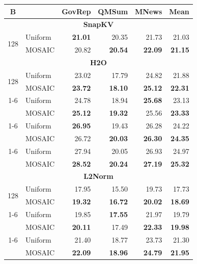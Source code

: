 \begin{table}[tp]
  \centering
  \scriptsize
  \setlength{\tabcolsep}{5pt}
  \renewcommand{\arraystretch}{0.92}
  \begin{tabular}{@{} c l rrrr @{}}
    \toprule
    \textbf{B} & & \textbf{GovRep} & \textbf{QMSum} & \textbf{MNews} & \textbf{Mean} \\
    \midrule
    \multicolumn{6}{c}{\textbf{SnapKV}} \\
    \midrule
    \multirow{2}{*}{128} & Uniform & \textbf{21.01} & 20.35 & 21.73 & 21.03 \\
     & MOSAIC & 20.82 & \textbf{20.54} & \textbf{22.09} & \textbf{21.15} \\
    \midrule
    \multicolumn{6}{c}{\textbf{H2O}} \\
    \midrule
    \multirow{2}{*}{128} & Uniform & 23.02 & 17.79 & 24.82 & 21.88 \\
     & MOSAIC & \textbf{23.72} & \textbf{18.10} & \textbf{25.12} & \textbf{22.31} \\
    \cmidrule(l){1-6}
    \multirow{2}{*}{256} & Uniform & 24.78 & 18.94 & \textbf{25.68} & 23.13 \\
     & MOSAIC & \textbf{25.12} & \textbf{19.32} & 25.56 & \textbf{23.33} \\
    \cmidrule(l){1-6}
    \multirow{2}{*}{512} & Uniform & \textbf{26.95} & 19.43 & 26.28 & 24.22 \\
     & MOSAIC & 26.72 & \textbf{20.03} & \textbf{26.30} & \textbf{24.35} \\
    \cmidrule(l){1-6}
    \multirow{2}{*}{1024} & Uniform & 27.94 & 20.05 & 26.93 & 24.97 \\
     & MOSAIC & \textbf{28.52} & \textbf{20.24} & \textbf{27.19} & \textbf{25.32} \\
    \midrule
    \multicolumn{6}{c}{\textbf{L2Norm}} \\
    \midrule
    \multirow{2}{*}{128} & Uniform & 17.95 & 15.50 & 19.73 & 17.73 \\
     & MOSAIC & \textbf{19.32} & \textbf{16.72} & \textbf{20.02} & \textbf{18.69} \\
    \cmidrule(l){1-6}
    \multirow{2}{*}{256} & Uniform & 19.85 & \textbf{17.55} & 21.97 & 19.79 \\
     & MOSAIC & \textbf{20.11} & 17.49 & \textbf{22.33} & \textbf{19.98} \\
    \cmidrule(l){1-6}
    \multirow{2}{*}{512} & Uniform & 21.40 & 18.77 & 23.73 & 21.30 \\
     & MOSAIC & \textbf{22.09} & \textbf{18.96} & \textbf{24.79} & \textbf{21.95} \\

\end{tabular}
\end{table}
